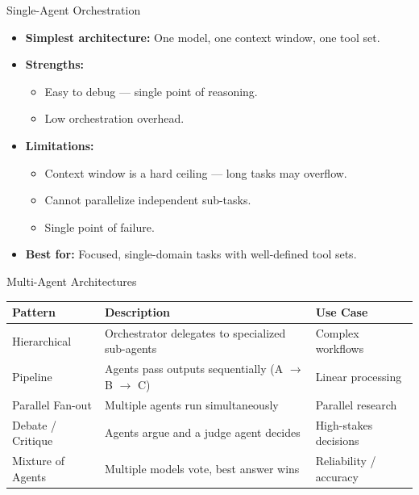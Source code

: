 \documentclass{beamer}       %
\begin{document}
\begin{frame}{Single-Agent Orchestration}
    \begin{itemize}
        \item \textbf{Simplest architecture:} One model, one context window, one tool set.
        \item \textbf{Strengths:}
            \begin{itemize}
                \item Easy to debug --- single point of reasoning.
                \item Low orchestration overhead.
            \end{itemize}
        \item \textbf{Limitations:}
            \begin{itemize}
                \item Context window is a hard ceiling --- long tasks may overflow.
                \item Cannot parallelize independent sub-tasks.
                \item Single point of failure.
            \end{itemize}
        \item \textbf{Best for:} Focused, single-domain tasks with well-defined tool sets.
    \end{itemize}
\end{frame}

\begin{frame}{Multi-Agent Architectures}
    \small
    \begin{table}[]
        \centering
        \begin{tabular}{@{}lll@{}}
            \toprule
            \textbf{Pattern}       & \textbf{Description}                              & \textbf{Use Case} \\ \midrule
            Hierarchical           & Orchestrator delegates to specialized sub-agents  & Complex workflows \\
            Pipeline               & Agents pass outputs sequentially (A $\to$ B $\to$ C) & Linear processing \\
            Parallel Fan-out       & Multiple agents run simultaneously                & Parallel research \\
            Debate / Critique      & Agents argue and a judge agent decides            & High-stakes decisions \\
            Mixture of Agents      & Multiple models vote, best answer wins            & Reliability / accuracy \\
            \bottomrule
        \end{tabular}
    \end{table}
\end{frame}
\end{document}
